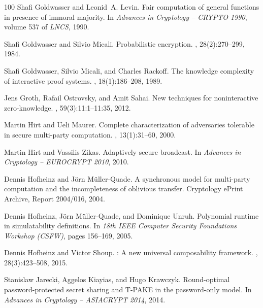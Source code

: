 \documentclass[11pt,a4paper]{article}
\begin{document}
\begin{thebibliography}{100}
Shafi Goldwasser and Leonid~A. Levin.
\newblock Fair computation of general functions in presence of immoral
  majority.
\newblock In {\em Advances in Cryptology -- CRYPTO 1990}, volume 537 of {\em
  LNCS}, 1990.

Shafi Goldwasser and Silvio Micali.
\newblock Probabilistic encryption.
, 28(2):270--299, 1984.

Shafi Goldwasser, Silvio Micali, and Charles Rackoff.
\newblock The knowledge complexity of interactive proof systems.
, 18(1):186--208, 1989.

Jens Groth, Rafail Ostrovsky, and Amit Sahai.
\newblock New techniques for noninteractive zero-knowledge.
, 59(3):11:1--11:35, 2012.

Martin Hirt and Ueli Maurer.
\newblock Complete characterization of adversaries tolerable in secure
  multi-party computation.
, 13(1):31--60, 2000.

Martin Hirt and Vassilis Zikas.
\newblock Adaptively secure broadcast.
\newblock In {\em Advances in Cryptology -- EUROCRYPT 2010}, 2010.

Dennis Hofheinz and J{\"o}rn M{\"u}ller-Quade.
\newblock A synchronous model for multi-party computation and the
  incompleteness of oblivious transfer.
\newblock Cryptology ePrint Archive, Report 2004/016, 2004.

Dennis Hofheinz, J{\"o}rn M{\"u}ller-Quade, and Dominique Unruh.
\newblock Polynomial runtime in simulatability definitions.
\newblock In {\em 18th IEEE Computer Security Foundations Workshop (CSFW)},
  pages 156--169, 2005.

Dennis Hofheinz and Victor Shoup.
: A new universal composability framework.
, 28(3):423--508, 2015.

Stanislaw Jarecki, Aggelos Kiayias, and Hugo Krawczyk.
\newblock Round-optimal password-protected secret sharing and {T-PAKE} in the
  password-only model.
\newblock In {\em Advances in Cryptology -- ASIACRYPT 2014}, 2014.


\end{thebibliography}
\end{document}
